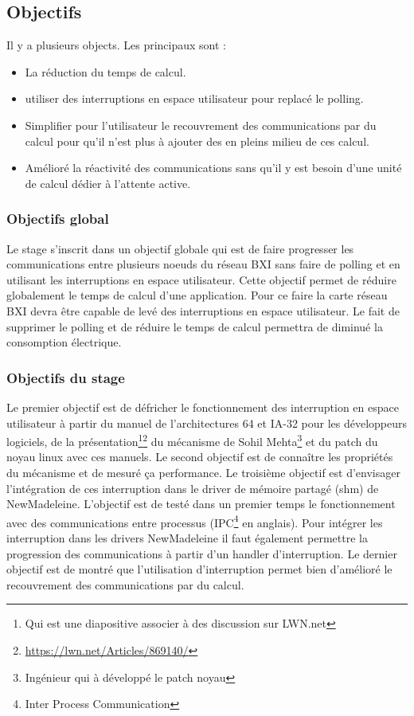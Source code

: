 \subsection{Objectifs}

Il y a plusieurs objects. Les principaux sont :

\begin{itemize}
  \item La réduction du temps de calcul.
  \item utiliser des interruptions en espace utilisateur pour replacé le polling.
  \item Simplifier pour l'utilisateur le recouvrement des communications par du calcul pour qu'il n'est plus à ajouter des  en pleins milieu de ces calcul.
  \item Amélioré la réactivité des communications sans qu'il y est besoin d'une unité de calcul dédier à l'attente active.
\end{itemize}

\subsubsection{Objectifs global}

Le stage s'inscrit dans un objectif globale qui est de faire progresser les communications entre plusieurs noeuds du réseau BXI sans faire de polling et en utilisant les interruptions en espace utilisateur.
Cette objectif permet de réduire globalement le temps de calcul d'une application.
Pour ce faire la carte réseau BXI devra être capable de levé des interruptions en espace utilisateur.
Le fait de supprimer le polling et de réduire le temps de calcul permettra de diminué la consomption électrique.


\subsubsection{Objectifs du stage}

Le premier objectif est de défricher le fonctionnement des interruption en espace utilisateur à partir du manuel \intel{} de l'architectures 64 et IA-32 pour les développeurs logiciels, de la présentation\footnote{Qui est une diapositive associer à des discussion sur LWN.net}\footnote{\url{https://lwn.net/Articles/869140/}} du mécanisme de Sohil Mehta\footnote{Ingénieur \intel{} qui à développé le patch noyau} et du patch du noyau linux avec ces manuels.
Le second objectif est de connaître les propriétés du mécanisme et de mesuré ça performance.
Le troisième objectif est d'envisager l'intégration de ces interruption dans le driver de mémoire partagé (shm) de NewMadeleine.
L'objectif est de testé dans un premier temps le fonctionnement avec des communications entre processus (IPC\footnote{Inter Process Communication} en anglais).
Pour intégrer les interruption dans les drivers NewMadeleine il faut également permettre la progression des communications à partir d'un handler d'interruption.
Le dernier objectif est de montré que l'utilisation d'interruption permet bien d'amélioré le recouvrement des communications par du calcul.

